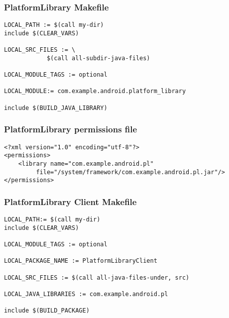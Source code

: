 \begin{frame}[fragile]
  \frametitle{PlatformLibrary Makefile}
\begin{verbatim}
LOCAL_PATH := $(call my-dir)
include $(CLEAR_VARS)

LOCAL_SRC_FILES := \
            $(call all-subdir-java-files)

LOCAL_MODULE_TAGS := optional

LOCAL_MODULE:= com.example.android.platform_library

include $(BUILD_JAVA_LIBRARY)
\end{verbatim}
\end{frame}

\begin{frame}[fragile]
  \frametitle{PlatformLibrary permissions file}
\begin{verbatim}
<?xml version="1.0" encoding="utf-8"?>
<permissions>
    <library name="com.example.android.pl"
         file="/system/framework/com.example.android.pl.jar"/>
</permissions>
\end{verbatim}
\end{frame}

\begin{frame}[fragile]
  \frametitle{PlatformLibrary Client Makefile}
\begin{verbatim}
LOCAL_PATH:= $(call my-dir)
include $(CLEAR_VARS)

LOCAL_MODULE_TAGS := optional

LOCAL_PACKAGE_NAME := PlatformLibraryClient

LOCAL_SRC_FILES := $(call all-java-files-under, src)

LOCAL_JAVA_LIBRARIES := com.example.android.pl

include $(BUILD_PACKAGE)
\end{verbatim}
\end{frame}
